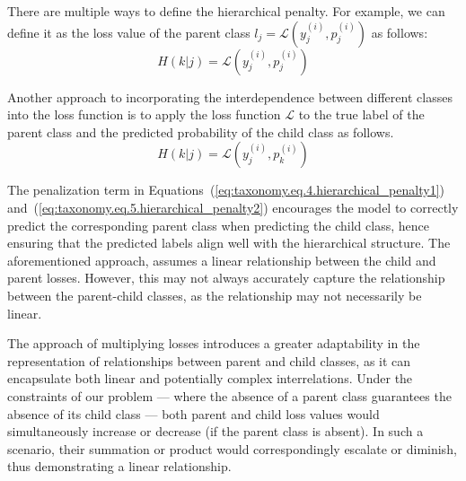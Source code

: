 \documentclass[review,1p,times,numbers]{elsarticle}
\begin{document}
There are multiple ways to define the hierarchical penalty. For example, we can define it as the loss value of the parent class $l_j=\mathcal{L} \left(y_j^{(i)},p_j^{(i)}\right) $ as follows:
\begin{equation}
    H(k \vert j)=\mathcal{L} \left(y_j^{(i)},p_j^{(i)}\right)
    \label{eq:taxonomy.eq.4.hierarchical_penalty1}
\end{equation}

Another approach to incorporating the interdependence between different classes into the loss function is to apply the loss function $\mathcal{L} $ to the true label of the parent class and the predicted probability of the child class as follows.
\begin{equation}
    H(k\vert j)  = \mathcal{L} \left(y_j^{(i)},p_k^{(i)}\right)
    \label{eq:taxonomy.eq.5.hierarchical_penalty2}
\end{equation}

The penalization term in Equations~(\ref{eq:taxonomy.eq.4.hierarchical_penalty1}) and~(\ref{eq:taxonomy.eq.5.hierarchical_penalty2}) encourages the model to correctly predict the corresponding parent class when predicting the child class, hence ensuring that the predicted labels  align well with the hierarchical structure. The aforementioned approach, assumes a linear relationship  between the child and parent losses. However, this may not always accurately capture the relationship between the parent-child classes, as the relationship may not necessarily be linear.

The approach of multiplying losses introduces a greater adaptability in the representation of relationships between parent and child classes, as it can encapsulate both linear and potentially complex interrelations. Under the constraints of our problem --- where the absence of a parent class guarantees the absence of its child class --- both parent and child loss values would simultaneously increase or decrease (if the parent class is absent). In such a scenario, their summation or product would correspondingly escalate or diminish, thus demonstrating a linear relationship.
\end{document}
